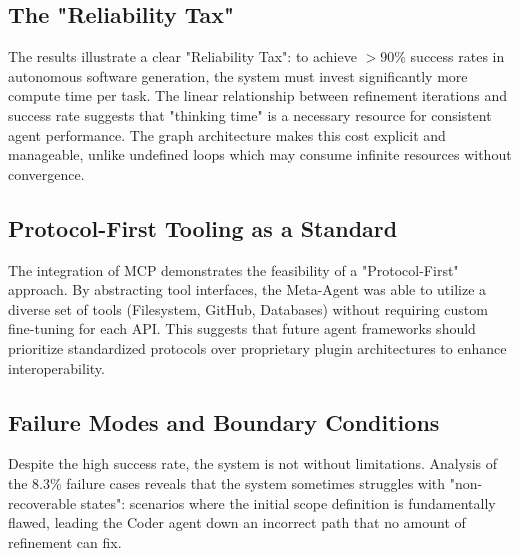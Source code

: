 \documentclass[lettersize,journal]{IEEEtran}
\begin{document}
\subsection{The "Reliability Tax"}
The results illustrate a clear "Reliability Tax": to achieve $>$90\% success rates in autonomous software generation, the system must invest significantly more compute time per task. The linear relationship between refinement iterations and success rate suggests that "thinking time" is a necessary resource for consistent agent performance. The graph architecture makes this cost explicit and manageable, unlike undefined loops which may consume infinite resources without convergence.

\subsection{Protocol-First Tooling as a Standard}
The integration of MCP demonstrates the feasibility of a "Protocol-First" approach. By abstracting tool interfaces, the Meta-Agent was able to utilize a diverse set of tools (Filesystem, GitHub, Databases) without requiring custom fine-tuning for each API. This suggests that future agent frameworks should prioritize standardized protocols over proprietary plugin architectures to enhance interoperability.

\subsection{Failure Modes and Boundary Conditions}
Despite the high success rate, the system is not without limitations. Analysis of the 8.3\% failure cases reveals that the system sometimes struggles with "non-recoverable states": scenarios where the initial scope definition is fundamentally flawed, leading the Coder agent down an incorrect path that no amount of refinement can fix.
\end{document}
